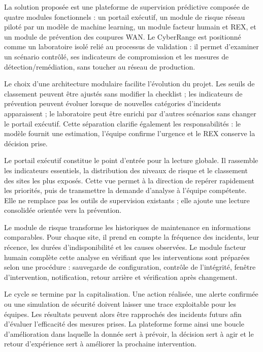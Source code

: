 \documentclass[12pt,a4paper,oneside]{report}
\begin{document}
La solution proposée est une plateforme de supervision prédictive composée de quatre modules fonctionnels : un portail exécutif, un module de risque réseau piloté par un modèle de machine learning, un module facteur humain et REX, et un module de prévention des coupures WAN. Le CyberRange est positionné comme un laboratoire isolé relié au processus de validation : il permet d’examiner un scénario contrôlé, ses indicateurs de compromission et les mesures de détection/remédiation, sans toucher au réseau de production.

Le choix d’une architecture modulaire facilite l’évolution du projet. Les seuils de classement peuvent être ajustés sans modifier la checklist ; les indicateurs de prévention peuvent évoluer lorsque de nouvelles catégories d’incidents apparaissent ; le laboratoire peut être enrichi par d’autres scénarios sans changer le portail exécutif. Cette séparation clarifie également les responsabilités : le modèle fournit une estimation, l’équipe confirme l’urgence et le REX conserve la décision prise.

Le portail exécutif constitue le point d’entrée pour la lecture globale. Il rassemble les indicateurs essentiels, la distribution des niveaux de risque et le classement des sites les plus exposés. Cette vue permet à la direction de repérer rapidement les priorités, puis de transmettre la demande d’analyse à l’équipe compétente. Elle ne remplace pas les outils de supervision existants ; elle ajoute une lecture consolidée orientée vers la prévention.

Le module de risque transforme les historiques de maintenance en informations comparables. Pour chaque site, il prend en compte la fréquence des incidents, leur récence, les durées d’indisponibilité et les causes observées. Le module facteur humain complète cette analyse en vérifiant que les interventions sont préparées selon une procédure : sauvegarde de configuration, contrôle de l’intégrité, fenêtre d’intervention, notification, retour arrière et vérification après changement.

Le cycle se termine par la capitalisation. Une action réalisée, une alerte confirmée ou une simulation de sécurité doivent laisser une trace exploitable pour les équipes. Les résultats peuvent alors être rapprochés des incidents futurs afin d’évaluer l’efficacité des mesures prises. La plateforme forme ainsi une boucle d’amélioration dans laquelle la donnée sert à prévoir, la décision sert à agir et le retour d’expérience sert à améliorer la prochaine intervention.
\end{document}
